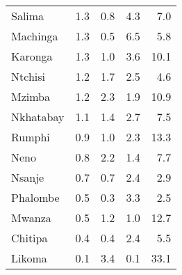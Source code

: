 \begin{tabular}{lrrrr}
Salima         &      1.3 &               0.8 &      4.3 &               7.0 \\
Machinga       &      1.3 &               0.5 &      6.5 &               5.8 \\
Karonga        &      1.3 &               1.0 &      3.6 &              10.1 \\
Ntchisi        &      1.2 &               1.7 &      2.5 &               4.6 \\
Mzimba         &      1.2 &               2.3 &      1.9 &              10.9 \\
Nkhatabay      &      1.1 &               1.4 &      2.7 &               7.5 \\
Rumphi         &      0.9 &               1.0 &      2.3 &              13.3 \\
Neno           &      0.8 &               2.2 &      1.4 &               7.7 \\
Nsanje         &      0.7 &               0.7 &      2.4 &               2.9 \\
Phalombe       &      0.5 &               0.3 &      3.3 &               2.5 \\
Mwanza         &      0.5 &               1.2 &      1.0 &              12.7 \\
Chitipa        &      0.4 &               0.4 &      2.4 &               5.5 \\
Likoma         &      0.1 &               3.4 &      0.1 &              33.1 \\
\bottomrule
\end{tabular}
